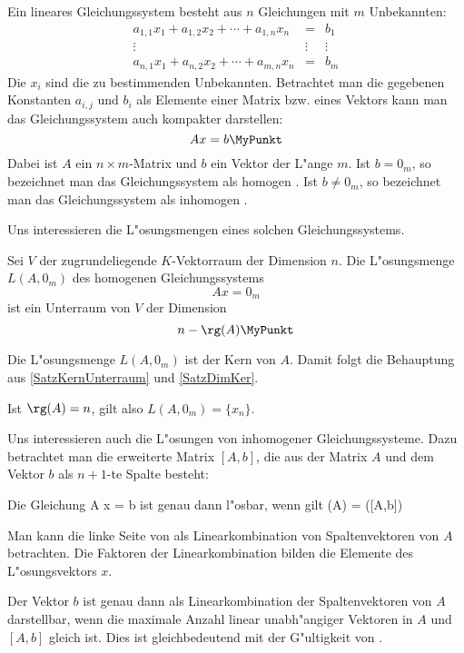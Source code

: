 Ein lineares Gleichungssystem besteht aus $n$ Gleichungen mit $m$
Unbekannten:
\begin{eqnarray*}
    a_{1,1} x_1 + a_{1,2} x_2 + \cdots + a_{1,n} x_n & = & b_1 \\
    \vdots & \vdots & \vdots \\
    a_{n,1} x_1 + a_{n,2} x_2 + \cdots + a_{m,n} x_n & = & b_m
\end{eqnarray*}
Die $x_i$ sind die zu bestimmenden Unbekannten. Betrachtet man die
gegebenen Konstanten $a_{i,j}$ und $b_i$ als Elemente einer Matrix
bzw. eines Vektors kann man das Gleichungssystem auch kompakter
darstellen:
\[ A x = b \MyPunkt \]
Dabei ist $A$ ein $n \times m$-Matrix und $b$ ein Vektor der L"ange $m$.
Ist $b= 0_m$, so bezeichnet man das Gleichungssystem als
homogen .
Ist $b \neq 0_m$, so bezeichnet man das Gleichungssystem als
inhomogen .

Uns interessieren die L"osungsmengen eines solchen Gleichungssystems.

\begin{satz}
\label{SatzLoesungsraum}
    Sei $V$ der zugrundeliegende $K$-Vektorraum der Dimension $n$.
    Die L"osungsmenge $L(A,0_m)$ des homogenen Gleichungssystems
    \[ A x = 0_m \] ist ein Unterraum von $V$ der Dimension
    \[ n - \rg(A) \MyPunkt \]
\end{satz}
\begin{beweis}
    Die L"osungsmenge $L(A,0_m)$ ist der Kern von $A$. Damit folgt
    die Behauptung aus \ref{SatzKernUnterraum} und
    \ref{SatzDimKer}.
\end{beweis}

Ist $\rg(A)=n$, gilt also $L(A,0_m) = \{ x_n \}$.

Uns interessieren auch die L"osungen von inhomogener Gleichungssysteme.
Dazu betrachtet man die erweiterte Matrix $[A,b]$, die aus der Matrix
$A$ und dem Vektor $b$ als $n+1$-te Spalte besteht:

\begin{satz}
\label{SatzRangGleich}
    Die Gleichung
        A x = b \MyPunkt
    \Eeq
    ist genau dann l"osbar, wenn gilt
        \rg(A) = \rg([A,b]) \MyPunkt
    \Eeq
\end{satz}
\begin{beweis}
    Man kann die linke Seite von  als 
    Linearkombination von Spaltenvektoren von $A$ betrachten. Die Faktoren der
    Linearkombination bilden die Elemente des L"osungsvektors $x$.

    Der Vektor $b$ ist genau dann als Linearkombination der
    Spaltenvektoren von $A$ darstellbar, wenn die maximale Anzahl linear
    unabh"angiger Vektoren in $A$ und $[A,b]$ gleich ist. Dies ist
    gleichbedeutend mit der G"ultigkeit von .
\end{beweis}


